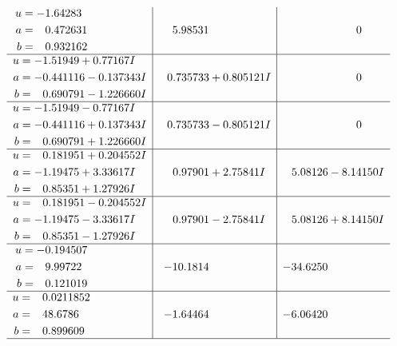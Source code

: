 \documentclass[1p]{elsarticle_modified}
\theoremstyle{definition}
\begin{document}
$$\begin{array}{c|c|c}
\begin{aligned}
u &= -1.64283\phantom{ +0.000000I} \\
a &= \phantom{-}0.472631\phantom{ +0.000000I} \\
b &= \phantom{-}0.932162\phantom{ +0.000000I}\end{aligned}
 & \phantom{-}5.98531\phantom{ +0.000000I} & \phantom{-0.000000 } 0 \\ \hline\begin{aligned}
u &= -1.51949 + 0.77167 I \\
a &= -0.441116 - 0.137343 I \\
b &= \phantom{-}0.690791 - 1.226660 I\end{aligned}
 & \phantom{-}0.735733 + 0.805121 I & \phantom{-0.000000 } 0 \\ \hline\begin{aligned}
u &= -1.51949 - 0.77167 I \\
a &= -0.441116 + 0.137343 I \\
b &= \phantom{-}0.690791 + 1.226660 I\end{aligned}
 & \phantom{-}0.735733 - 0.805121 I & \phantom{-0.000000 } 0 \\ \hline\begin{aligned}
u &= \phantom{-}0.181951 + 0.204552 I \\
a &= -1.19475 + 3.33617 I \\
b &= \phantom{-}0.85351 + 1.27926 I\end{aligned}
 & \phantom{-}0.97901 + 2.75841 I & \phantom{-}5.08126 - 8.14150 I \\ \hline\begin{aligned}
u &= \phantom{-}0.181951 - 0.204552 I \\
a &= -1.19475 - 3.33617 I \\
b &= \phantom{-}0.85351 - 1.27926 I\end{aligned}
 & \phantom{-}0.97901 - 2.75841 I & \phantom{-}5.08126 + 8.14150 I \\ \hline\begin{aligned}
u &= -0.194507\phantom{ +0.000000I} \\
a &= \phantom{-}9.99722\phantom{ +0.000000I} \\
b &= \phantom{-}0.121019\phantom{ +0.000000I}\end{aligned}
 & -10.1814\phantom{ +0.000000I} & -34.6250\phantom{ +0.000000I} \\ \hline\begin{aligned}
u &= \phantom{-}0.0211852\phantom{ +0.000000I} \\
a &= \phantom{-}48.6786\phantom{ +0.000000I} \\
b &= \phantom{-}0.899609\phantom{ +0.000000I}\end{aligned}
 & -1.64464\phantom{ +0.000000I} & -6.06420\phantom{ +0.000000I}\\
 \hline 
 \end{array}$$\newpage\newpage\renewcommand{\arraystretch}{1}
\end{document}
